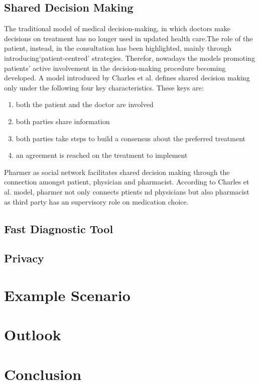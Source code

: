 \documentclass[journal]{IEEEtran}
\begin{document}
\subsection{Shared Decision Making}
\label{subsec: SDM}
The traditional model of medical decision-making, in which doctors make decisions on treatment has no longer used in updated health care.The role of the patient, instead, in the consultation has been highlighted, mainly through introducing‘patient-centred’ strategies. Therefor, nowadays the models promoting patients' active involvement in the decision-making procedure becoming developed.
 A model introduced by Charles et al. defines shared decision making only under the following four key characteristics.
 These keys are:
 \begin{enumerate}
   \item both the patient and the doctor are involved
   \item both parties share information
   \item both parties take steps to build a consensus about the preferred treatment
   \item an agreement is reached on the treatment to implement
 \end{enumerate}

Pharmer as social network facilitates shared decision making through the connection amongst patient, physician and pharmacist. According to Charles et al. model, pharmer not only connects ptients nd physicians but also pharmacist as third party has an supervisory role on medication choice.

\subsection{Fast Diagnostic Tool}

\subsection{Privacy}

\section{Example Scenario}
\label{es}

\section{Outlook}
\label{outlook}

\section{Conclusion}
\label{sec:conclusion}

\begin{spacing}{0.3}


\end{spacing}

\end{document}

